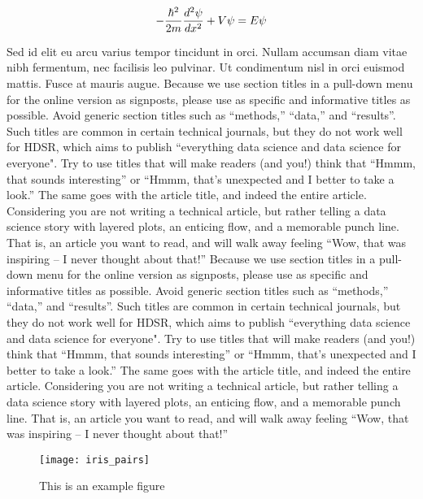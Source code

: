 \documentclass[]{hdsr}
\begin{document}
\begin{equation}
-\frac{\hbar^2}{2m} \frac{d^2 \psi}{dx^2} + V\psi = E\psi\\
\end{equation}

Sed id elit eu arcu varius tempor tincidunt in orci. Nullam accumsan diam vitae nibh fermentum, nec facilisis leo pulvinar. Ut condimentum nisl in orci euismod mattis. Fusce at mauris augue. Because we use section titles in a pull-down menu for the online version as signposts, please use as specific and informative titles as possible. Avoid generic section titles such as ``methods,'' ``data,'' and ``results''. Such titles are common in certain technical journals, but they do not work well for HDSR, which aims to publish ``everything data science and data science for everyone". Try to use titles that will make readers (and you!) think that ``Hmmm, that sounds interesting'' or ``Hmmm, that's unexpected and I better to take a look.''   The same goes with the article title, and indeed the entire article.  Considering you are not writing a technical article, but rather telling a data science story with layered plots, an enticing flow, and a memorable punch line. That is, an article you want to read, and will walk away feeling ``Wow, that was inspiring -- I never thought about that!'' Because we use section titles in a pull-down menu for the online version as signposts, please use as specific and informative titles as possible. Avoid generic section titles such as ``methods,'' ``data,'' and ``results''. Such titles are common in certain technical journals, but they do not work well for HDSR, which aims to publish ``everything data science and data science for everyone". Try to use titles that will make readers (and you!) think that ``Hmmm, that sounds interesting'' or ``Hmmm, that's unexpected and I better to take a look.''   The same goes with the article title, and indeed the entire article.  Considering you are not writing a technical article, but rather telling a data science story with layered plots, an enticing flow, and a memorable punch line. That is, an article you want to read, and will walk away feeling ``Wow, that was inspiring -- I never thought about that!'' 

\begin{figure}[H]
    \centering
    \texttt{[image: iris\_pairs]} \\
    \caption{This is an example figure}
    \label{fig:my_label}
\end{figure}
\end{document}

